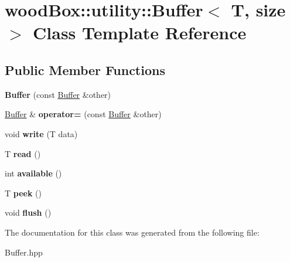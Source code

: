 \hypertarget{classwood_box_1_1utility_1_1_buffer}{}\section{wood\+Box\+:\+:utility\+:\+:Buffer$<$ T, size $>$ Class Template Reference}
\label{classwood_box_1_1utility_1_1_buffer}
\subsection*{Public Member Functions}
\begin{DoxyCompactItemize}
\item 
\mbox{\label{classwood_box_1_1utility_1_1_buffer_aebdfb364cf6e64092a1553231adb7a85}} 
{\bfseries Buffer} (const \mbox{\hyperlink{classwood_box_1_1utility_1_1_buffer}{Buffer}} \&other)
\item 
\mbox{\label{classwood_box_1_1utility_1_1_buffer_a051d336a9ee59bc40b7723ec3a54521e}} 
\mbox{\hyperlink{classwood_box_1_1utility_1_1_buffer}{Buffer}} \& {\bfseries operator=} (const \mbox{\hyperlink{classwood_box_1_1utility_1_1_buffer}{Buffer}} \&other)
\item 
\mbox{\label{classwood_box_1_1utility_1_1_buffer_a2d7857dc93d7e229941ca36a018587e9}} 
void {\bfseries write} (T data)
\item 
\mbox{\label{classwood_box_1_1utility_1_1_buffer_a8832f6e544e23f738ee50216d805572d}} 
T {\bfseries read} ()
\item 
\mbox{\label{classwood_box_1_1utility_1_1_buffer_a2bcef18ccdd923a401608a257e4283ca}} 
int {\bfseries available} ()
\item 
\mbox{\label{classwood_box_1_1utility_1_1_buffer_a9aa51ab0987fdbcfb72fccc1c806ba50}} 
T {\bfseries peek} ()
\item 
\mbox{\label{classwood_box_1_1utility_1_1_buffer_a747e6bb3cd527dcf1651aa6758233666}} 
void {\bfseries flush} ()
\end{DoxyCompactItemize}


The documentation for this class was generated from the following file\+:\begin{DoxyCompactItemize}
\item 
Buffer.\+hpp\end{DoxyCompactItemize}
